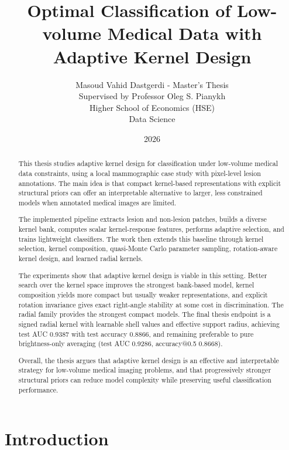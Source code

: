 \documentclass{cernatsnote}
\title{\textbf{Optimal Classification of Low-volume Medical Data with Adaptive Kernel Design}}
\author{
	  Masoud Vahid Dastgerdi - Master's Thesis \; \\	
        Supervised by Professor Oleg S. Pianykh \\
	Higher School of Economics (HSE) \\
        Data Science
}
\date{2026}
\let\oldsection\section
\let\oldsubsection\subsection
\let\oldsubsubsection\subsubsection
\let\chapter\oldsection
\let\section\oldsubsection
\let\subsection\oldsubsubsection
\begin{document}
\maketitle


\begin{abstract}
This thesis studies adaptive kernel design for classification under low-volume medical data constraints, using a local mammographic case study with pixel-level lesion annotations. The main idea is that compact kernel-based representations with explicit structural priors can offer an interpretable alternative to larger, less constrained models when annotated medical images are limited.

The implemented pipeline extracts lesion and non-lesion patches, builds a diverse kernel bank, computes scalar kernel-response features, performs adaptive selection, and trains lightweight classifiers. The work then extends this baseline through kernel selection, kernel composition, quasi-Monte Carlo parameter sampling, rotation-aware kernel design, and learned radial kernels.

The experiments show that adaptive kernel design is viable in this setting. Better search over the kernel space improves the strongest bank-based model, kernel composition yields more compact but usually weaker representations, and explicit rotation invariance gives exact right-angle stability at some cost in discrimination. The radial family provides the strongest compact models. The final thesis endpoint is a signed radial kernel with learnable shell values and effective support radius, achieving test AUC 0.9387 with test accuracy 0.8866, and remaining preferable to pure brightness-only averaging (test AUC 0.9286, accuracy@0.5 0.8668).

Overall, the thesis argues that adaptive kernel design is an effective and interpretable strategy for low-volume medical imaging problems, and that progressively stronger structural priors can reduce model complexity while preserving useful classification performance.
\end{abstract}


\tableofcontents
\clearpage


\chapter{Introduction}
\end{document}

